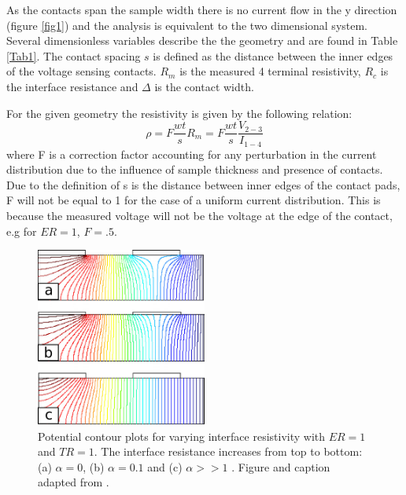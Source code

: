 As the contacts span the sample width there is no current flow in the y direction (figure \ref{fig1}) and the analysis is equivalent to the two dimensional system. Several dimensionless variables describe the the geometry and are found in Table \ref{Tab1}. The contact spacing $s$ is defined as the distance between the inner edges of the voltage sensing contacts. $R_m$ is the measured 4 terminal resistivity, $R_c$ is the interface resistance and $\Delta$ is the contact width. 

For the given geometry the resistivity is given by the following relation: 
\begin{equation}
    \rho   = F \frac{wt}{s}R_m = F \frac{wt}{s}\frac{V_{2-3}}{I_{1-4}}
\end{equation} 
where F is a correction factor accounting for any perturbation in the current distribution due to the influence of sample thickness and presence of contacts. Due to the definition of s is the distance between inner edges of the contact pads, F will not be equal to 1 for the case of a uniform current distribution. This is because the measured voltage will not be the voltage at the edge of the contact, e.g for $ER = 1$, $F = .5$.


 
 \begin{figure}[]
  \centering
    \includegraphics[width=0.5\textwidth]{fig/4pp/finite_contact_contour.png}
 \caption{ Potential contour plots for varying interface resistivity with $ER=1$ and $TR= 1$. The interface resistance increases from top to bottom: (a) \hspace{.5mm} $\alpha=0$, (b) \hspace{.5mm} $\alpha=0.1$ and (c) \hspace{.5mm} $\alpha>> 1$ . Figure and caption adapted from \cite{Zimney2007CorrectionStudy}.}
 \label{fig2}
\end{figure}


